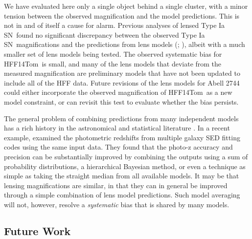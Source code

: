 \documentclass[iop]{emulateapj}
\def\P14{\citetalias{Patel:2014}}
\def\tomas{HFF14Tom}
\newcommand{\SNIa}{Type Ia SN}
\begin{document}
We have evaluated here only a single object behind a single cluster,
with a minor tension between the observed magnification and the model
predictions.  This is not in and of itself a cause for alarm.
Previous analyses of lensed \SNIa\ found no significant discrepancy
between the observed \SNIa\ magnifications and the predictions from
lens models (\P14; \citealt{Nordin:2014}), albeit
with a much smaller set of lens models being tested.  The observed
systematic bias for \tomas\ is small, and many of the lens models that
deviate from the measured magnification are preliminary models that
have not been updated to include all of the HFF data.  Future
revisions of the lens models for Abell 2744 could either incorporate
the observed magnification of \tomas\ as a new model constraint, or
can revisit this test to evaluate whether the bias persists.

The general problem of combining predictions from many independent
models has a rich history in the astronomical and statistical
literature \citep[e.g.,][]{Press:1997,Hoeting:1999,Liddle:2009}.
In a recent example, \citet{Dahlen:2013} examined the photometric
redshifts from multiple galaxy SED fitting codes using the same input
data.  They found that the photo-z accuracy and precision can be
substantially improved by combining the outputs using a sum of
probability distributions, a hierarchical Bayesian method, or even a
technique as simple as taking the straight median from all available
models.  It may be that lensing magnifications are similar, in that
they can in general be improved through a simple combination of lens
model predictions.  Such model averaging will not, however, resolve a
{\it systematic} bias that is shared by many models.

\subsection{Future Work}
\end{document}
